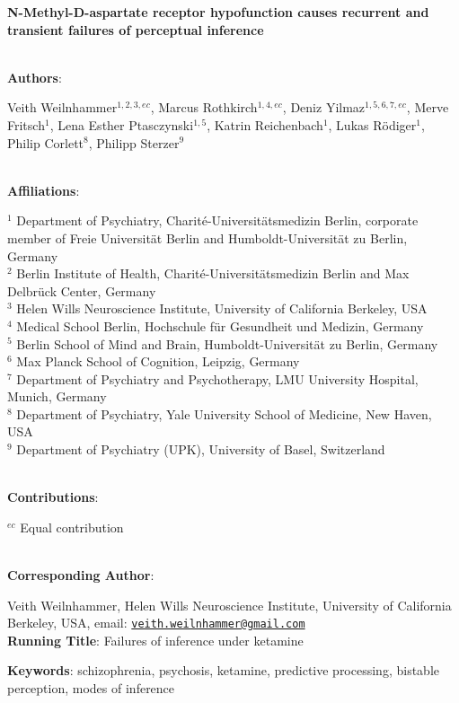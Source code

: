 \documentclass[
]{article}
\author{}
\date{\vspace{-2.5em}}
\begin{document}
\textbf{N-Methyl-D-aspartate receptor hypofunction causes recurrent and
transient failures of perceptual inference}\\
\strut \\

\textbf{Authors}:

Veith Weilnhammer\(^{1,2, 3,ec}\), Marcus Rothkirch\(^{1, 4, ec}\),
Deniz Yilmaz\(^{1,5,6,7, ec}\), Merve Fritsch\(^{1}\), Lena Esther
Ptasczynski\(^{1,5}\), Katrin Reichenbach\(^{1}\), Lukas
Rödiger\(^{1}\), Philip Corlett\(^{8}\), Philipp Sterzer\(^{9}\)\\
\strut \\
\textbf{Affiliations}:

\(^{1}\) Department of Psychiatry, Charité-Universitätsmedizin Berlin,
corporate member of Freie Universität Berlin and Humboldt-Universität zu
Berlin, Germany\\
\(^{2}\) Berlin Institute of Health, Charité-Universitätsmedizin Berlin
and Max Delbrück Center, Germany\\
\(^{3}\) Helen Wills Neuroscience Institute, University of California
Berkeley, USA\\
\(^{4}\) Medical School Berlin, Hochschule für Gesundheit und Medizin,
Germany\\
\(^{5}\) Berlin School of Mind and Brain, Humboldt-Universität zu
Berlin, Germany\\
\(^{6}\) Max Planck School of Cognition, Leipzig, Germany\\
\(^{7}\) Department of Psychiatry and Psychotherapy, LMU University
Hospital, Munich, Germany\\
\(^{8}\) Department of Psychiatry, Yale University School of Medicine,
New Haven, USA\\
\(^{9}\) Department of Psychiatry (UPK), University of Basel,
Switzerland\\
\strut \\
\textbf{Contributions}:

\(^{ec}\) Equal contribution\\
\strut \\
\textbf{Corresponding Author}:

Veith Weilnhammer, Helen Wills Neuroscience Institute, University of
California Berkeley, USA, email:
\href{mailto:veith.weilnhammer@gmail.com}{\nolinkurl{veith.weilnhammer@gmail.com}}\\

\textbf{Running Title}: Failures of inference under ketamine

\textbf{Keywords}: schizophrenia, psychosis, ketamine, predictive
processing, bistable perception, modes of inference
\end{document}

